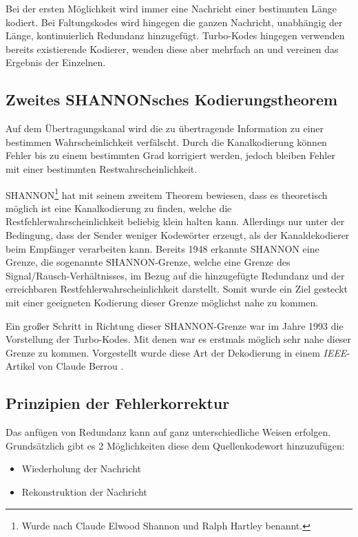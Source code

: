 Bei der ersten Möglichkeit wird immer eine Nachricht einer bestimmten Länge kodiert. Bei Faltungskodes wird hingegen die ganzen Nachricht, unabhängig der Länge, kontinuierlich Redundanz hinzugefügt. Turbo-Kodes hingegen verwenden bereits existierende Kodierer, wenden diese aber mehrfach an und vereinen das Ergebnis der Einzelnen.

\subsection{Zweites SHANNONsches Kodierungstheorem}
\label{sec:shannonTheorem}
Auf dem Übertragungskanal wird die zu übertragende Information zu einer bestimmen Wahrscheinlichkeit verfälscht. Durch die Kanalkodierung können Fehler bis zu einem bestimmten Grad korrigiert werden, jedoch bleiben Fehler mit einer bestimmten Restwahrscheinlichkeit.

SHANNON\footnote{Wurde nach Claude Elwood Shannon und Ralph Hartley benannt.} hat mit seinem zweitem Theorem bewiesen, dass es theoretisch möglich ist eine Kanalkodierung zu finden, welche die Restfehlerwahrscheinlichkeit beliebig klein halten kann. Allerdings nur unter der Bedingung, dass der Sender weniger Kodewörter erzeugt, als der Kanaldekodierer beim Empfänger verarbeiten kann. Bereits 1948 erkannte SHANNON eine Grenze, die sogenannte SHANNON-Grenze, welche eine Grenze des Signal/Rausch-Verhältnisses, im Bezug auf die hinzugefügte Redundanz und der erreichbaren Restfehlerwahrscheinlichkeit darstellt. Somit wurde ein Ziel gesteckt mit einer geeigneten Kodierung dieser Grenze möglichst nahe zu kommen. \cite[125 f.]{schoenfeld2012informations}

Ein großer Schritt in Richtung dieser SHANNON-Grenze war im Jahre 1993 die Vorstellung der Turbo-Kodes. Mit denen war es erstmals möglich sehr nahe dieser Grenze zu kommen. Vorgestellt wurde diese Art der Dekodierung in einem \emph{IEEE}-Artikel von Claude Berrou \cite{berrou1996near}.

\subsection{Prinzipien der Fehlerkorrektur}
\label{sec:principlesMistakesCorrection}
Das anfügen von Redundanz kann auf ganz unterschiedliche Weisen erfolgen. Grundsätzlich gibt es 2 Möglichkeiten diese dem Quellenkodewort hinzuzufügen:

\begin{itemize}
\item Wiederholung der Nachricht
\item Rekonstruktion der Nachricht
\end{itemize}

